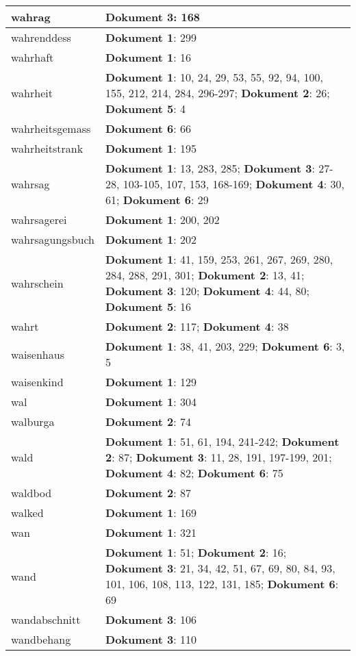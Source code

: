\documentclass[a5paper]{article}
\begin{document}
\begin{longtable}[l]{|l|p{3in}|}
\hline
wahrag & \textbf{Dokument 3}: 168 \\
\hline
wahrenddess & \textbf{Dokument 1}: 299 \\
\hline
wahrhaft & \textbf{Dokument 1}: 16 \\
\hline
wahrheit & \textbf{Dokument 1}: 10, 24, 29, 53, 55, 92, 94, 100, 155, 212, 214, 284, 296-297; \textbf{Dokument 2}: 26; \textbf{Dokument 5}: 4 \\
\hline
wahrheitsgemass & \textbf{Dokument 6}: 66 \\
\hline
wahrheitstrank & \textbf{Dokument 1}: 195 \\
\hline
wahrsag & \textbf{Dokument 1}: 13, 283, 285; \textbf{Dokument 3}: 27-28, 103-105, 107, 153, 168-169; \textbf{Dokument 4}: 30, 61; \textbf{Dokument 6}: 29 \\
\hline
wahrsagerei & \textbf{Dokument 1}: 200, 202 \\
\hline
wahrsagungsbuch & \textbf{Dokument 1}: 202 \\
\hline
wahrschein & \textbf{Dokument 1}: 41, 159, 253, 261, 267, 269, 280, 284, 288, 291, 301; \textbf{Dokument 2}: 13, 41; \textbf{Dokument 3}: 120; \textbf{Dokument 4}: 44, 80; \textbf{Dokument 5}: 16 \\
\hline
wahrt & \textbf{Dokument 2}: 117; \textbf{Dokument 4}: 38 \\
\hline
waisenhaus & \textbf{Dokument 1}: 38, 41, 203, 229; \textbf{Dokument 6}: 3, 5 \\
\hline
waisenkind & \textbf{Dokument 1}: 129 \\
\hline
wal & \textbf{Dokument 1}: 304 \\
\hline
walburga & \textbf{Dokument 2}: 74 \\
\hline
wald & \textbf{Dokument 1}: 51, 61, 194, 241-242; \textbf{Dokument 2}: 87; \textbf{Dokument 3}: 11, 28, 191, 197-199, 201; \textbf{Dokument 4}: 82; \textbf{Dokument 6}: 75 \\
\hline
waldbod & \textbf{Dokument 2}: 87 \\
\hline
walked & \textbf{Dokument 1}: 169 \\
\hline
wan & \textbf{Dokument 1}: 321 \\
\hline
wand & \textbf{Dokument 1}: 51; \textbf{Dokument 2}: 16; \textbf{Dokument 3}: 21, 34, 42, 51, 67, 69, 80, 84, 93, 101, 106, 108, 113, 122, 131, 185; \textbf{Dokument 6}: 69 \\
\hline
wandabschnitt & \textbf{Dokument 3}: 106 \\
\hline
wandbehang & \textbf{Dokument 3}: 110 \\

\end{longtable}
\end{document}
